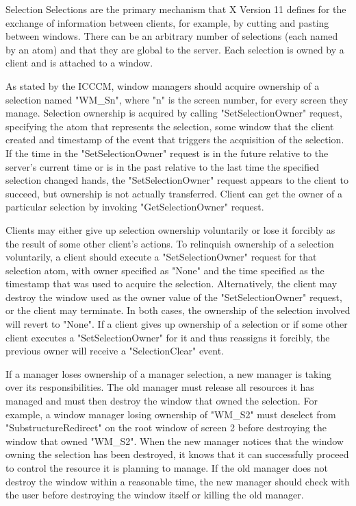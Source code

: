 \secc Selection
Selections are the primary mechanism that X Version 11 defines for the exchange of information between clients, for example, by cutting and pasting between windows.
There can be an arbitrary number of selections (each named by an atom) and that they are global to the server.
Each selection is owned by a client and is attached to a window.

As stated by the ICCCM, window managers should acquire ownership of a selection named "WM_Sn", where "n" is the screen number, for every screen they manage.
Selection ownership is acquired by calling "SetSelectionOwner" request, specifying the atom that represents the selection, some window that the client created
and timestamp of the event that triggers the acquisition of the selection.
If the time in the "SetSelectionOwner" request is in the future relative to the server's current time or is in the past relative
to the last time the specified selection changed hands, the "SetSelectionOwner" request appears to the client to succeed, but ownership is not actually transferred.
Client can get the owner of a particular selection by invoking "GetSelectionOwner" request.

Clients may either give up selection ownership voluntarily or lose it forcibly as the result of some other client's actions.
To relinquish ownership of a selection voluntarily, a client should execute a "SetSelectionOwner" request for that selection atom,
with owner specified as "None" and the time specified as the timestamp that was used to acquire the selection.
Alternatively, the client may destroy the window used as the owner value of the "SetSelectionOwner" request, or the client may terminate.
In both cases, the ownership of the selection involved will revert to "None".
If a client gives up ownership of a selection or if some other client executes a "SetSelectionOwner" for it and thus reassigns it forcibly,
the previous owner will receive a "SelectionClear" event.

If a manager loses ownership of a manager selection, a new manager is taking over its responsibilities.
The old manager must release all resources it has managed and must then destroy the window that owned the selection.
For example, a window manager losing ownership of "WM_S2" must deselect from "SubstructureRedirect" on the root window of screen 2 before destroying the window that owned "WM_S2".
When the new manager notices that the window owning the selection has been destroyed,
it knows that it can successfully proceed to control the resource it is planning to manage.
If the old manager does not destroy the window within a reasonable time, the new manager should check with the user before destroying the window itself or killing the old manager.

